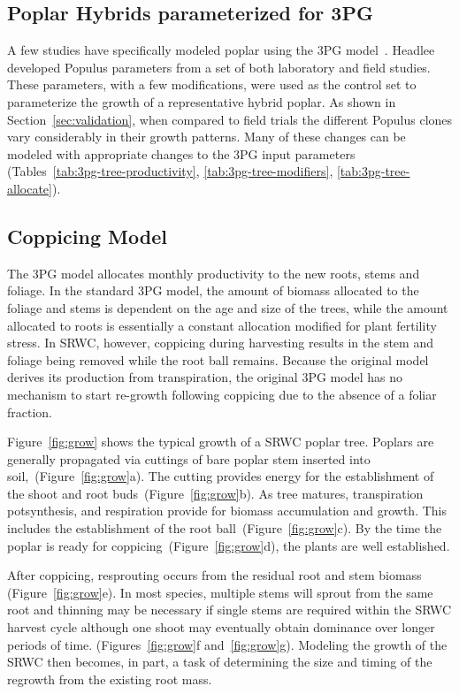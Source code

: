 \documentclass[10pt]{article}
\begin{document}
\subsection*{Poplar Hybrids parameterized for 3PG}

A few studies have specifically modeled poplar using the 3PG
model~\cite{Amichev2010,Headlee2012}. Headlee~\cite{Headlee2012} developed
Populus parameters from a set of both laboratory and field studies. These
parameters, with a few modifications, were used as the control set to
parameterize the growth of a representative hybrid poplar. As shown in
Section~\ref{sec:validation}, when compared to field trials the different
Populus clones vary considerably in their growth patterns. Many of these changes
can be modeled with appropriate changes to the 3PG input parameters
(Tables~\ref{tab:3pg-tree-productivity}, \ref{tab:3pg-tree-modifiers},
\ref{tab:3pg-tree-allocate}).

\subsection*{Coppicing Model}
\label{sec:coppicing-model}

The 3PG model allocates monthly productivity to the new roots, stems and
foliage. In the standard 3PG model, the amount of biomass allocated to the
foliage and stems is dependent on the age and size of the trees, while the
amount allocated to roots is essentially a constant allocation modified for
plant fertility stress. In SRWC, however, coppicing during harvesting results in
the stem and foliage being removed while the root ball remains. Because the
original model derives its production from transpiration, the original 3PG model
has no mechanism to start re-growth following coppicing due to the absence of a
foliar fraction.

Figure~\ref{fig:grow} shows the typical growth of a SRWC poplar tree.  Poplars
are generally propagated via cuttings of bare poplar stem inserted into
soil,~(Figure~\ref{fig:grow}a).  The cutting provides energy for the
establishment of the shoot and root buds~(Figure~\ref{fig:grow}b). As tree
matures, transpiration potsynthesis, and respiration provide for biomass
accumulation and growth.  This includes the establishment of the root
ball~(Figure~\ref{fig:grow}c).  By the time the poplar is ready for
coppicing~(Figure~\ref{fig:grow}d), the plants are well established.

After coppicing, resprouting occurs from the residual root and stem biomass
(Figure~\ref{fig:grow}e). In most species, multiple stems will sprout from the
same root and thinning may be necessary if single stems are required within the
SRWC harvest cycle although one shoot may eventually obtain dominance over
longer periods of time. (Figures~\ref{fig:grow}f
and~\ref{fig:grow}g). Modeling the growth of the SRWC then becomes, in part, a
task of determining the size and timing of the regrowth from the existing root
mass.
\end{document}
